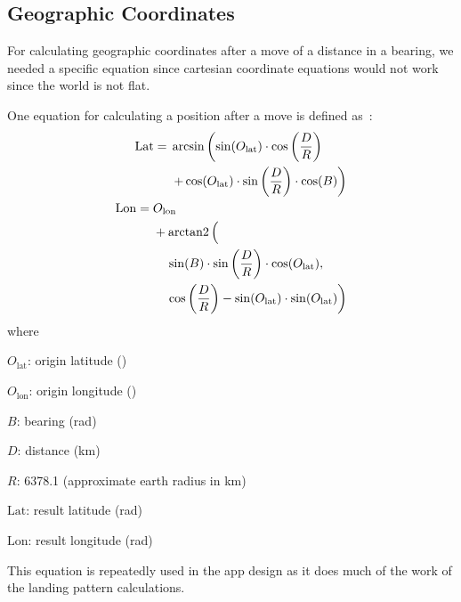 \subsection{Geographic Coordinates}
For calculating geographic coordinates after a move of a distance in a bearing, we needed a specific equation since cartesian coordinate equations would not work since the world is not flat.

One equation for calculating a position after a move is defined as~\cite{m_david_stackoverflow:_????}:
\begin{align}
  \begin{split}
    \mathrm{Lat} ={} &\arcsin\left(\sin(O_{\mathrm{lat}}) \cdot \cos\left(\frac{D}{R}\right) \right. \\
                     &\left.+ \cos(O_{\mathrm{lat}}) \cdot \sin\left(\frac{D}{R}\right) \cdot \cos(B)\right)
  \end{split}\label{eq:move-in-lat}\\
  \begin{split}
    \mathrm{Lon} ={} &O_{\mathrm{lon}} \\
                     & + \operatorname{arctan2}\left(\frac{}{}\right. \\
                     &\left.\quad\sin(B) \cdot \sin\left(\frac{D}{R}\right) \cdot \cos(O_{\mathrm{lat}}),\right. \\
                     &\left.\quad\cos\left(\frac{D}{R}\right) - \sin(O_{\mathrm{lat}}) \cdot \sin(O_{\mathrm{lat}})\right)
  \end{split}\label{eq:move-in-lon}
\end{align}
where
\begin{description}
  \item $O_{\mathrm{lat}}$: origin latitude (\si{\deg})
  \item $O_{\mathrm{lon}}$: origin longitude (\si{\deg})
  \item $B$: bearing (\si{\radian})
  \item $D$: distance (\si{\kilo\metre})
  \item $R$: 6378.1 (approximate earth radius in \si{\kilo\metre})
  \item $\mathrm{Lat}$: result latitude (\si{\radian})
  \item $\mathrm{Lon}$: result longitude (\si{\radian})
\end{description}

This equation is repeatedly used in the app design as it does much of the work of the landing pattern calculations.

